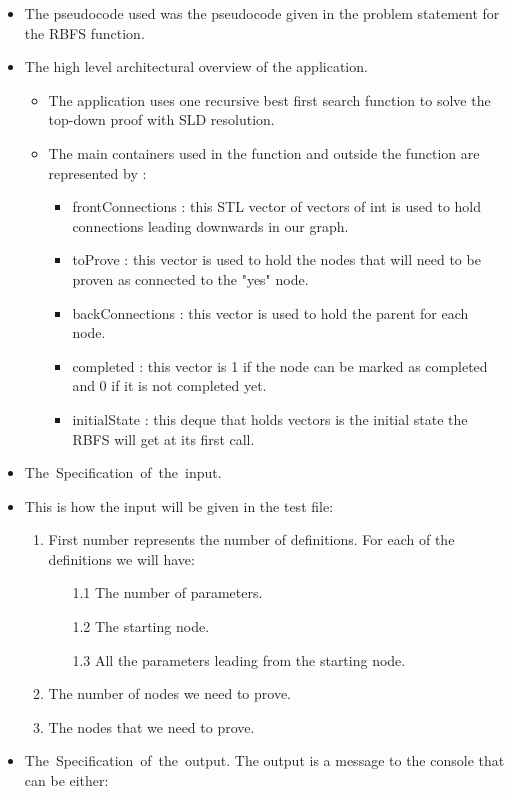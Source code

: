 \documentclass{article}
\begin{document}
\begin{itemize}
\item
The pseudocode used was the pseudocode given in the problem statement for the RBFS function.

\item
The high level architectural overview of the application.
\begin{itemize}
  \item The application uses one recursive best first search function to solve the top-down proof with SLD resolution.
  
  \item The main containers used in the function and outside the function are represented by :
  \begin{itemize}
  \item frontConnections : this STL vector of vectors of int is used to hold connections leading downwards in our graph.
  \item toProve : this vector is used to hold the nodes that will need to be proven as connected to the "yes" node.
   
  \item backConnections : this vector is used to hold the parent for each node.
  
  \item completed : this vector is 1 if the node can be marked as completed and 0 if it is not completed yet.
  
  \item initialState : this deque that holds vectors is the initial state the RBFS will get at its first call.
	\end{itemize}
  
\end{itemize}

\item
\mbox{The Specification of the input.}\linebreak
\linebreak
\item This is how the input will be given in the test file:
\begin{enumerate}	\item First number represents the number of definitions. For each of the definitions we will have:
	\begin{enumerate} \item[1.1] The number of parameters.
		\item[1.2] The starting node.
		\item[1.3] All the parameters leading from the starting node.
		\end{enumerate}
	\item The number of nodes we need to prove.
	\item The nodes that we need to prove.
	\end{enumerate}
\item
\mbox{The Specification of the output.}\linebreak
\linebreak
The output is a message to the console that can be either:


\end{itemize}
\end{document}
